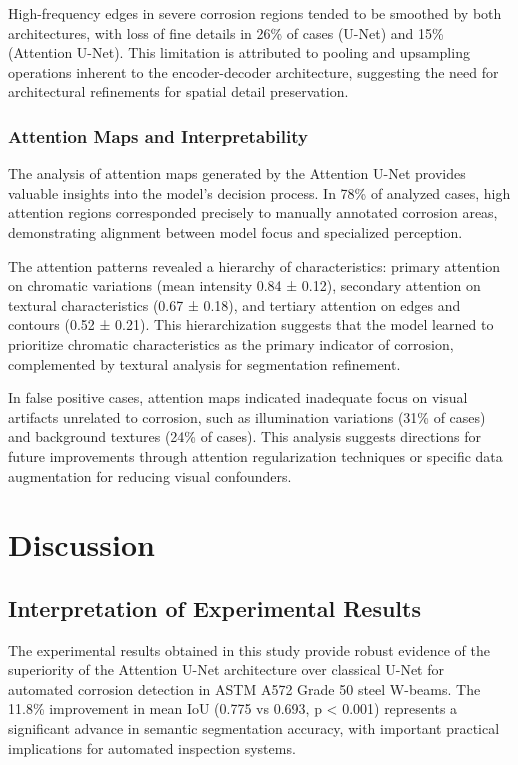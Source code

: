 \documentclass[Journal,letterpaper]{ascelike-new}
\begin{document}
High-frequency edges in severe corrosion regions tended to be smoothed by both architectures, with loss of fine details in 26\% of cases (U-Net) and 15\% (Attention U-Net). This limitation is attributed to pooling and upsampling operations inherent to the encoder-decoder architecture, suggesting the need for architectural refinements for spatial detail preservation.

\subsubsection{Attention Maps and Interpretability}

The analysis of attention maps generated by the Attention U-Net provides valuable insights into the model's decision process. In 78\% of analyzed cases, high attention regions corresponded precisely to manually annotated corrosion areas, demonstrating alignment between model focus and specialized perception.

The attention patterns revealed a hierarchy of characteristics: primary attention on chromatic variations (mean intensity 0.84 ± 0.12), secondary attention on textural characteristics (0.67 ± 0.18), and tertiary attention on edges and contours (0.52 ± 0.21). This hierarchization suggests that the model learned to prioritize chromatic characteristics as the primary indicator of corrosion, complemented by textural analysis for segmentation refinement.

In false positive cases, attention maps indicated inadequate focus on visual artifacts unrelated to corrosion, such as illumination variations (31\% of cases) and background textures (24\% of cases). This analysis suggests directions for future improvements through attention regularization techniques or specific data augmentation for reducing visual confounders.

\section{Discussion}
\label{sec:discussion}

\subsection{Interpretation of Experimental Results}
\label{subsec:results_interpretation}

The experimental results obtained in this study provide robust evidence of the superiority of the Attention U-Net architecture over classical U-Net for automated corrosion detection in ASTM A572 Grade 50 steel W-beams. The 11.8\% improvement in mean IoU (0.775 vs 0.693, p < 0.001) represents a significant advance in semantic segmentation accuracy, with important practical implications for automated inspection systems.
\end{document}
